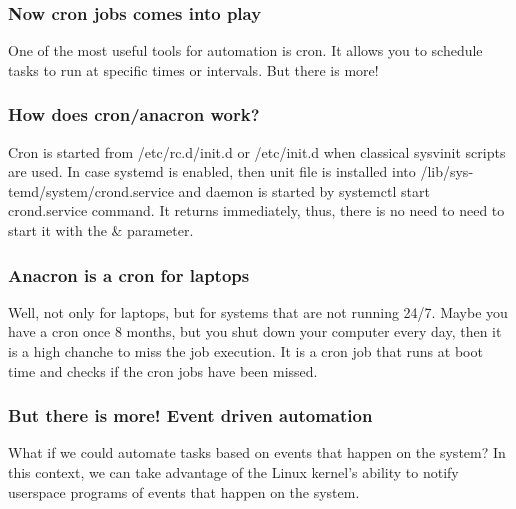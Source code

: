 \documentclass{beamer}
\begin{document}
\begin{frame}
\frametitle{Now cron jobs comes into play}
\small
    One of the most useful tools for automation is cron. \newline
    It allows you to schedule tasks to run at specific times or intervals. \newline
    But there is more! \newline
\end{frame}

\begin{frame}
    \frametitle{How does cron/anacron work?}
    \small
    Cron is started from /etc/rc.d/init.d or /etc/init.d when classical sysvinit scripts are used. In case systemd is enabled, then unit file is installed into /lib/sys‐
       temd/system/crond.service and daemon is started by systemctl start crond.service command. It returns immediately, thus, there is no need to need to start it with  the
       \& parameter.
\end{frame}

\begin{frame}
    \frametitle{Anacron is a cron for laptops}
    \small
    Well, not only for laptops, but for systems that are not running 24/7. \newline
    Maybe you have a cron once 8 months, but you shut down your computer
    every day, then it is a high chanche to miss the job execution. \newline \newline
    It is a cron job that runs at boot time and checks if the cron jobs have been
    missed. \newline

\end{frame}

\begin{frame}
\frametitle{But there is more! Event driven automation}
\small
    What if we could automate tasks based on events that happen on the system? \newline
    \pause
    In this context, we can take advantage of the Linux kernel's ability to
    notify userspace programs of events that happen on the system. \newline
\end{frame}
\end{document}
